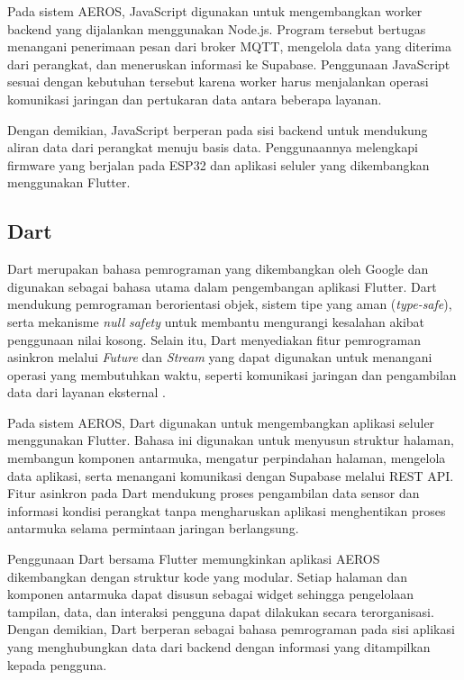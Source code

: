 Pada sistem AEROS, JavaScript digunakan untuk mengembangkan worker backend yang dijalankan menggunakan Node.js. Program tersebut bertugas menangani penerimaan pesan dari broker MQTT, mengelola data yang diterima dari perangkat, dan meneruskan informasi ke Supabase. Penggunaan JavaScript sesuai dengan kebutuhan tersebut karena worker harus menjalankan operasi komunikasi jaringan dan pertukaran data antara beberapa layanan.

Dengan demikian, JavaScript berperan pada sisi backend untuk mendukung aliran data dari perangkat menuju basis data. Penggunaannya melengkapi firmware yang berjalan pada ESP32 dan aplikasi seluler yang dikembangkan menggunakan Flutter.

\subsection{Dart}
\label{subsec:Bahasa_Dart}

Dart merupakan bahasa pemrograman yang dikembangkan oleh Google dan digunakan sebagai bahasa utama dalam pengembangan aplikasi Flutter. Dart mendukung pemrograman berorientasi objek, sistem tipe yang aman (\textit{type-safe}), serta mekanisme \textit{null safety} untuk membantu mengurangi kesalahan akibat penggunaan nilai kosong. Selain itu, Dart menyediakan fitur pemrograman asinkron melalui \textit{Future} dan \textit{Stream} yang dapat digunakan untuk menangani operasi yang membutuhkan waktu, seperti komunikasi jaringan dan pengambilan data dari layanan eksternal \cite{dart_overview}.

Pada sistem AEROS, Dart digunakan untuk mengembangkan aplikasi seluler menggunakan Flutter. Bahasa ini digunakan untuk menyusun struktur halaman, membangun komponen antarmuka, mengatur perpindahan halaman, mengelola data aplikasi, serta menangani komunikasi dengan Supabase melalui REST API. Fitur asinkron pada Dart mendukung proses pengambilan data sensor dan informasi kondisi perangkat tanpa mengharuskan aplikasi menghentikan proses antarmuka selama permintaan jaringan berlangsung.

Penggunaan Dart bersama Flutter memungkinkan aplikasi AEROS dikembangkan dengan struktur kode yang modular. Setiap halaman dan komponen antarmuka dapat disusun sebagai widget sehingga pengelolaan tampilan, data, dan interaksi pengguna dapat dilakukan secara terorganisasi. Dengan demikian, Dart berperan sebagai bahasa pemrograman pada sisi aplikasi yang menghubungkan data dari backend dengan informasi yang ditampilkan kepada pengguna.